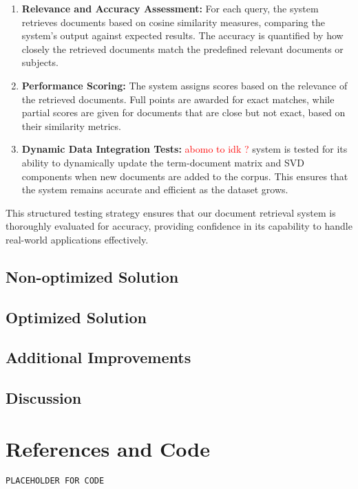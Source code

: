 \documentclass[12pt,a4paper]{article}
\begin{document}
\begin{enumerate}
    \item \textbf{Relevance and Accuracy Assessment:} For each query, the system retrieves documents based on cosine similarity measures, comparing the system’s output against expected results. The accuracy is quantified by how closely the retrieved documents match the predefined relevant documents or subjects.

    \item \textbf{Performance Scoring:} The system assigns scores based on the relevance of the retrieved documents. Full points are awarded for exact matches, while partial scores are given for documents that are close but not exact, based on their similarity metrics.

    \item \textbf{Dynamic Data Integration Tests:} \textcolor{red}{abomo to idk ?} system is tested for its ability to dynamically update the term-document matrix and SVD components when new documents are added to the corpus. This ensures that the system remains accurate and efficient as the dataset grows.
\end{enumerate}

\noindent This structured testing strategy ensures that our document retrieval system is thoroughly evaluated for accuracy, providing confidence in its capability to handle real-world applications effectively.


\subsection{Non-optimized Solution}



\subsection{Optimized Solution}

\subsection{Additional Improvements}

\newpage
\subsection{Discussion}

\newpage
\section{References and Code}

\begin{lstlisting}[style=Matlab-Pyglike]
PLACEHOLDER FOR CODE
\end{lstlisting}
\end{document}
